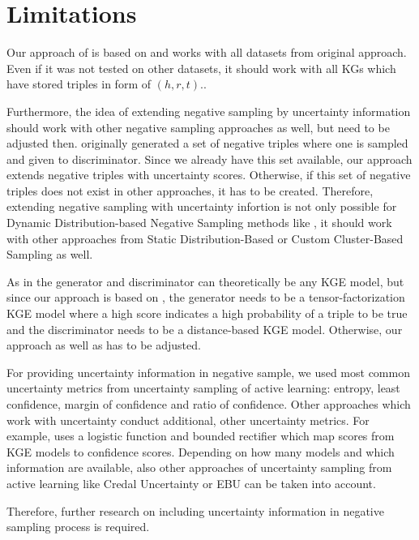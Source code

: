 \section{Limitations}  
\label{sec:limitations}

Our approach of \ucgan is based on \kbgan and works with all datasets from original approach.
Even if it was not tested on other datasets, it should work with all \acp{KG} which have stored triples in form of $(h,r,t)$..

Furthermore, the idea of extending negative sampling by uncertainty information should work with other negative sampling approaches as well, but need to be adjusted then.
\kbgan originally generated a set of negative triples where one is sampled and given to discriminator.
Since we already have this set available, our approach extends negative triples with uncertainty scores.
Otherwise, if this set of negative triples does not exist in other approaches, it has to be created.
Therefore, extending negative sampling with uncertainty infortion is not only possible for Dynamic Distribution-based Negative Sampling methods like \kbgan, it should work with other approaches from Static Distribution-Based or Custom Cluster-Based Sampling as well.

As in \kbgan the generator and discriminator can theoretically be any \ac{KGE} model, but since our approach is based on \kbgan, the generator needs to be a tensor-factorization \ac{KGE} model where a high score indicates a high probability of a triple to be true and the discriminator needs to be a distance-based \ac{KGE} model.
Otherwise, our approach as well as \kban has to be adjusted.

For providing uncertainty information in negative sample, we used most common uncertainty metrics from uncertainty sampling of active learning:
entropy, least confidence, margin of confidence and ratio of confidence.
Other approaches which work with uncertainty conduct additional, other uncertainty metrics.
For example, \cite{UKGE} uses a logistic function and bounded rectifier which map scores from \ac{KGE} models to confidence scores.
Depending on how many models and which information are available, also other approaches of uncertainty sampling from active learning like Credal Uncertainty or \ac{EBU} can be taken into account.

Therefore, further research on including uncertainty information in negative sampling process is required.



